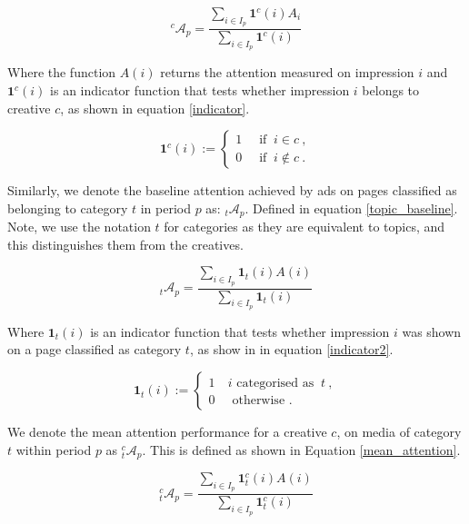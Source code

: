 \documentclass[sigconf]{acmart}
\begin{document}
\begin{equation}
\label{campaign_baseline}
{}^c\mathcal{A}_p =  \frac{ \sum_{i \in I_p} \mathbf{1}^c(i) A_i }{ \sum_{i \in I_p} \mathbf{1}^c(i) }
\end{equation}

Where the function $A(i)$ returns the attention measured on impression $i$ and
$\mathbf{1}^c(i)$ is an indicator function that
tests whether impression $i$ belongs to creative $c$, as shown in equation \ref{indicator}.

\begin{equation}
\label{indicator}
  \mathbf{1}^{c}(i):=
  \begin{cases}1~&{\text{ if }}~i\in c~,\\0~&{\text{ if }}~i\notin c~.\end{cases}
\end{equation}

Similarly, we denote the baseline attention achieved by ads on pages classified
as belonging to category $t$ in period $p$ as: ${}_t\mathcal{A}_p$. Defined in
equation \ref{topic_baseline}. Note, we use the notation $t$ for categories as they
are equivalent to topics, and this distinguishes them from the creatives.


\begin{equation}
\label{topic_baseline}
{}_t\mathcal{A}_p =  \frac{ \sum_{i \in I_p} \mathbf{1}_t(i) A(i) }{ \sum_{i \in I_p} \mathbf{1}_t(i) }
\end{equation}

Where $\mathbf{1}_t(i)$ is an indicator function that
tests whether impression $i$ was shown on a page classified as category $t$,
as show in in equation \ref{indicator2}.

\begin{equation}
\label{indicator2}
  \mathbf{1}_{t}(i):=
  \begin{cases}1~&{ i\text{ categorised as }}~t~,\\0~&{\text{ otherwise }}.\end{cases}
\end{equation}

We denote the mean attention performance for a creative $c$, on media of category $t$
within period $p$ as ${}^c_t\mathcal{A}_p$.
This is defined as shown in Equation \ref{mean_attention}.

\begin{equation}
\label{mean_attention}
{}^c_t\mathcal{A}_p =  \frac{ \sum_{i \in I_p} \mathbf{1}^c_t(i) A(i) }{ \sum_{i \in I_p} \mathbf{1}^c_t(i) }
\end{equation}
\end{document}
